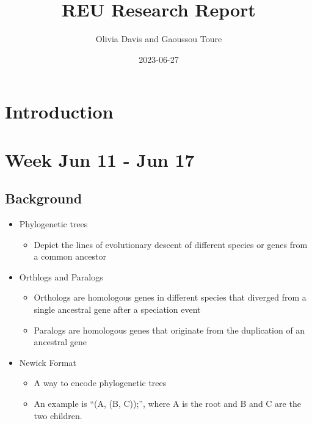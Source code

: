 \documentclass[
  11pt,
  letterpaper,
  oneside]{book}
\title{REU Research Report}
\author{Olivia Davis and Gaoussou Toure}
\date{2023-06-27}
\providecommand{\tightlist}{%
  \setlength{\itemsep}{0pt}\setlength{\parskip}{0pt}}\usepackage{longtable,booktabs,array}
\renewcommand*\contentsname{Table of contents}
\newcommand\contentsname{Table of contents}
\begin{document}
\frontmatter
\maketitle
\ifdefined\Shaded\renewenvironment{Shaded}{\begin{tcolorbox}[sharp corners, breakable, borderline west={3pt}{0pt}{shadecolor}, colback={codebgcolor}, frame hidden, enhanced, boxrule=0pt]}{\end{tcolorbox}}\fi

\renewcommand*\contentsname{Contents}
{
\hypersetup{linkcolor=}
\setcounter{tocdepth}{4}
\tableofcontents
}
\mainmatter
{}

\hypertarget{introduction}{%
\chapter*{Introduction}\label{introduction}}



\hypertarget{week-jun-11---jun-17}{%
\chapter{Week Jun 11 - Jun 17}\label{week-jun-11---jun-17}}

\hypertarget{background}{%
\section{Background}\label{background}}

\begin{itemize}
\tightlist
\item
  Phylogenetic trees

  \begin{itemize}
  \tightlist
  \item
    Depict the lines of evolutionary descent of different species or
    genes from a common ancestor
  \end{itemize}
\item
  Orthlogs and Paralogs

  \begin{itemize}
  \tightlist
  \item
    Orthologs are homologous genes in different species that diverged
    from a single ancestral gene after a speciation event
  \item
    Paralogs are homologous genes that originate from the duplication of
    an ancestral gene
  \end{itemize}
\item
  Newick Format

  \begin{itemize}
  \tightlist
  \item
    A way to encode phylogenetic trees
  \item
    An example is ``(A, (B, C));'', where A is the root and B and C are
    the two children.
  \end{itemize}
\end{itemize}
\end{document}
